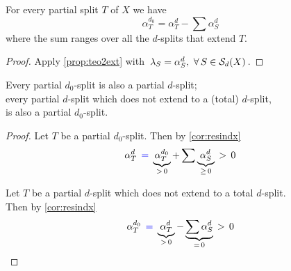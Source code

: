 \documentclass[./main.tex]{subfiles}
\begin{document}
\clearpage

\begin{corollary} \label{cor:resindx}
    For every partial split $T$ of $X$ we have
    \[ \alpha_T^{d_0} = \alpha_T^d - \sum \alpha_S^d \]
    where the sum ranges over all the $d$-splits that extend $T$.
\end{corollary}
\begin{proof}
    Apply \autoref{prop:teo2ext} with $\, \lambda_S = \alpha_S^d,\ \forall\, S \in {\mathcal{S}}_d(X) \,$.
\end{proof}

\begin{corollary}[{\cites[Corollary 3]{BD92a}}]
    Every partial $d_0$-split is also a partial $d$-split; \\[5pt]
    every partial $d$-split which does not extend to a (total) $d$-split, \\
    \bsp is also a partial $d_0$-split.
\end{corollary}
\begin{proof}
    Let $T$ be a partial $d_0$-split. Then by \autoref{cor:resindx}
    \[ \alpha_T^d \,\mathcolor{blue}{=}\, \underbrace{\alpha_T^{d_0}}_{>\,0} + \sum \underbrace{\alpha_S^d}_{\geq\,0} \,>\, 0 \nospblw \] \smallskip
    
    Let $T$ be a partial $d$-split which does not extend to a total $d$-split. \\
    Then by \autoref{cor:resindx}
    \[ \alpha_T^{d_0} \,\mathcolor{blue}{=}\, \underbrace{\alpha_T^{d}}_{>\,0} - \underbrace{\sum \alpha_S^d}_{=\,0} \,>\, 0 \nospblw \]
\end{proof}
\end{document}
